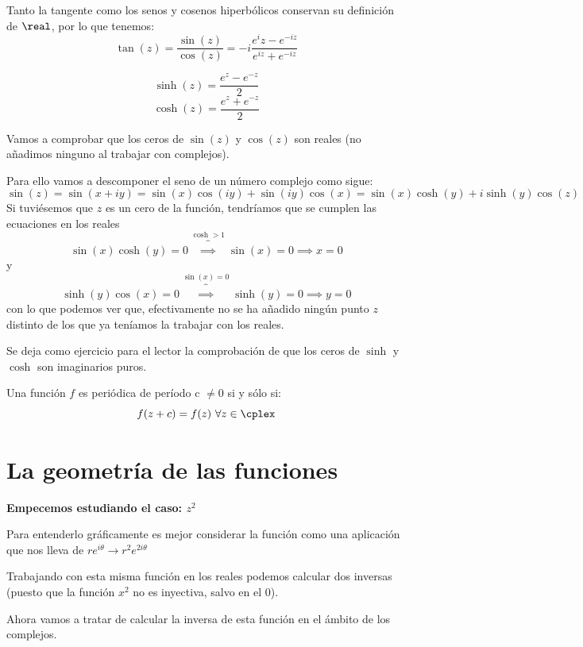 \documentclass{apuntes}
\begin{document}
Tanto la tangente como los senos y cosenos hiperbólicos conservan su definición de $\real$, por lo que tenemos:
\[\tan(z)=\frac{\sin(z)}{\cos(z)}=-i \frac{e^iz-e^{-iz}}{e^{iz}+e^{-iz}}\]

\[\sinh(z)=\frac{e^z-e^{-z}}{2}\]
\[\cosh(z)=\frac{e^z+e^{-z}}{2}\]

\begin{example}
Vamos a comprobar que los ceros de $\sin(z)$ y $\cos(z)$ son reales (no añadimos ninguno al trabajar con complejos).

Para ello vamos a descomponer el seno de un número complejo como sigue:
\[\sin(z)=\sin(x+iy)=\sin(x)\cos(iy)+\sin(iy)\cos(x)=\sin(x)\cosh(y)+i\sinh(y)\cos(z)\]
Si tuviésemos que $z$ es un cero de la función, tendríamos que se cumplen las ecuaciones en los reales
\[\sin(x)\cosh(y)=0 \overbrace{\implies}^{\cosh > 1} \sin(x)=0 \implies x = 0\]
y
\[\sinh(y)\cos(x)=0 \overbrace{\implies}^{\sin(x)=0} \sinh(y)=0 \implies y=0\]
con lo que podemos ver que, efectivamente no se ha añadido ningún punto $z$ distinto de los que ya teníamos la trabajar con los reales.
\end{example}

Se deja como ejercicio para el lector la comprobación de que los ceros de $\sinh$ y $\cosh$ son imaginarios puros.

\begin{defn}
Una función $f$ es periódica de período c $\neq 0$ si y sólo si:
\[f(z+c)=f(z) \ \forall z \in \cplex\]
\end{defn}

\section{La geometría de las funciones}
\textbf{Empecemos estudiando el caso: $z^2$}

Para entenderlo gráficamente es mejor considerar la función como una aplicación que nos lleva de $re^{i\theta} \to r^2e^{2i\theta}$

\begin{figure}[hbtp]
  \centering
\end{figure}

Trabajando con esta misma función en los reales podemos calcular dos inversas (puesto que la función $x^2$ no es inyectiva, salvo en el 0).

Ahora vamos a tratar de calcular la inversa de esta función en el ámbito de los complejos.
\end{document}
